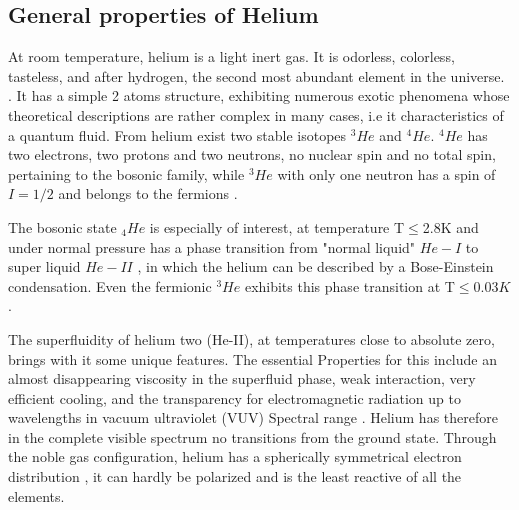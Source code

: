 \subsection{General properties of Helium}


At room temperature, helium is a light inert gas. It is odorless, colorless, tasteless, and after hydrogen, the second most abundant element in the universe.  \cite{enss_low-temperature_2005}. It has a simple 2 atoms structure, exhibiting numerous exotic phenomena whose theoretical descriptions are rather complex in many cases, i.e it characteristics of a quantum fluid. From helium exist two stable isotopes $^{3}He$ and $^{4}He$.  $^{4}He$ has two electrons, two protons and two neutrons, no nuclear spin and no total spin, pertaining to the bosonic family, while $^{3}He$ with only one neutron has a spin of $I = 1/2$ and belongs to the fermions \cite{atkins_liquid_2014}.

The bosonic state $_{4}He$ is especially of interest, at  temperature T$\leqslant$2.8K and under normal pressure has a phase transition from "normal liquid" $He-I$ to super liquid $He-II$ \cite{swenson_liquid-solid_1950}, in which the helium can be described by a Bose-Einstein condensation. Even the fermionic $^{3}He$ exhibits this phase transition at T$\leqslant 0.03K$ \cite{halperin_properties_1978}.

The superfluidity of helium two (He-II), at temperatures close to absolute zero, brings with it some unique features. The essential Properties for this include an almost disappearing viscosity in the superfluid phase, weak interaction, very efficient cooling, and the transparency for electromagnetic radiation up to wavelengths in vacuum ultraviolet (VUV) Spectral range \cite{enss_low-temperature_2005}. Helium has therefore in the complete visible spectrum no transitions from the ground state. Through the noble gas configuration, helium has a spherically symmetrical electron distribution \cite{lewis_Helium_2014}, it can hardly be polarized and is the least reactive of all the elements.

